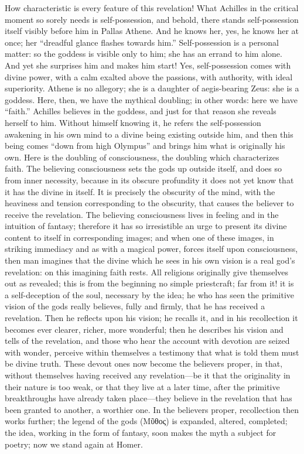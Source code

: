\documentclass[12pt]{book}
\newcommand{\opage}[1]{\marginnote{\footnotesize\textit{[#1]}}}
\begin{document}
How characteristic is every feature of this revelation! What Achilles in
the critical moment so sorely needs is self-possession, and behold,
there stands self-possession itself visibly before him in Pallas Athene.
And he knows her, yes, he knows her at once; her ``dreadful glance
flashes towards him.'' Self-possession is a personal matter: so the
goddess is visible only to him; she has an errand to him alone. And yet
she surprises him and makes him start! Yes, self-possession comes with
divine power, with a calm exalted above the passions, with authority,
with ideal superiority. Athene is no allegory; she is a daughter of
aegis-bearing Zeus: she is a goddess. Here, then, we have the mythical
doubling; in other words: here we have ``faith.'' Achilles believes in
the goddess, and just for that reason she reveals herself to him.
Without himself knowing it, he refers the self-possession awakening in
his own mind to a divine being existing outside him, and then this being
comes ``down from high Olympus'' and brings him what is originally his
own. Here is the doubling of consciousness, the doubling which
characterizes faith. The believing consciousness sets the gods up
outside itself, and does so from inner necessity, because in its obscure
profundity it
\opage{94}\setcounter{footnote}{0}%
does not yet know that it has the divine in itself. It is precisely the
obscurity of the mind, with the heaviness and tension corresponding to
the obscurity, that causes the believer to receive the revelation. The
believing consciousness lives in feeling and in the intuition of
fantasy; therefore it has so irresistible an urge to present its divine
content to itself in corresponding images; and when one of these images,
in striking immediacy and as with a magical power, forces itself upon
consciousness, then man imagines that the divine which he sees in his
own vision is a real god's revelation: on this imagining faith rests.
All religions originally give themselves out as revealed; this is from
the beginning no simple priestcraft; far from it! it is a
self-deception of the soul, necessary by the idea; he who has seen the
primitive vision of the gods really believes, fully and firmly, that he
has received a revelation. %
Then he reflects upon his vision; he recalls it, and in his recollection
it becomes ever clearer, richer, more wonderful; then he describes his
vision and tells of the revelation, and those who hear the account with
devotion are seized with wonder, perceive within themselves a testimony
that what is told them must be divine truth. These devout ones now
become the believers proper, in that, without themselves having received
any revelation---be it that the originality in their nature is too weak,
or that they live at a later time, after the primitive breakthroughs
have already taken place---they believe in the revelation that has been
granted to another, a worthier one. In the believers proper,
recollection then works further; the legend of the gods (Μῦθος) is
expanded, altered, completed; the idea, working in the form of fantasy,
soon makes the myth a subject for poetry; now we stand again at Homer.
\end{document}
